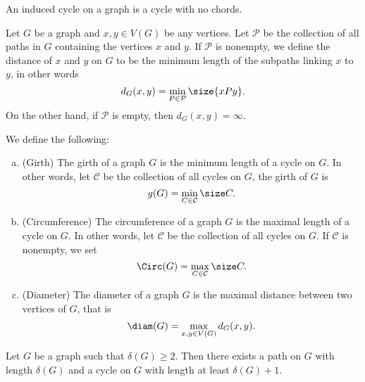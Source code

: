 \begin{definition}\label{def: induced-cycle}
  An induced cycle on a graph is a cycle with no chords.
\end{definition}

\begin{definition}[Distance]\label{def: vertex-distance}
  Let \(G\) be a graph and \(x, y \in V(G)\) be any vertices. Let \(\mathcal P\)
  be the collection of all paths in \(G\) containing the vertices \(x\) and
  \(y\). If \(\mathcal P\) is nonempty, we define the distance of \(x\) and
  \(y\) on \(G\) to be the minimum length of the subpaths linking \(x\) to
  \(y\), in other words
  \[
    d_G(x, y) = \min_{P \in \mathcal P} \size{xPy}.
  \]
  On the other hand, if \(\mathcal P\) is empty, then \(d_G(x, y) = \infty\).
\end{definition}

\begin{definition}
  \label{def: miscellaneous-graph-cycle}
  We define the following:
  \begin{enumerate}[(a).]
    \setlength\itemsep{0.0em}
    \item\label{def: girth}
      (Girth) The girth of a graph \(G\) is the minimum length of a cycle on
      \(G\). In other words, let \(\mathcal C\) be the collection of all cycles
      on \(G\), the girth of \(G\) is
      \[
        g(G) = \min_{C \in \mathcal C} \size C.
      \]
    \item\label{def: circ-graph}
      (Circumference) The circumference of a graph \(G\) is the maximal length
      of a cycle on \(G\). In other words, let \(\mathcal C\) be the collection
      of all cycles on \(G\). If \(\mathcal C\) is nonempty, we set
      \[
        \Circ(G) = \max_{C \in \mathcal C} \size C.
      \]
    \item\label{def: diameter}
      (Diameter) The diameter of a graph \(G\) is the maximal distance between
      two vertices of \(G\), that is
      \[
        \diam(G) = \max_{x, y \in V(G)} d_G(x, y).
      \]
  \end{enumerate}
\end{definition}

\begin{proposition}\label{prop: path-cycle-len-delta}
  Let \(G\) be a graph such that \(\delta(G) \geq 2\). Then there exists a path
  on \(G\) with length \(\delta(G)\) and a cycle on \(G\) with length at least
  \(\delta(G) + 1\).
\end{proposition}
